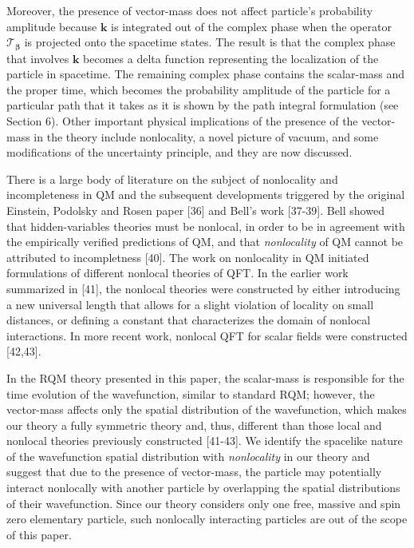 \documentclass[12pt]{iopart}
\begin{document}
Moreover, the presence of vector-mass does not affect particle's probability amplitude
because $\boldsymbol{k}$ is integrated out of the complex phase when the operator 
$\mathcal{T}_{\boldsymbol{\beta}}$ is projected onto the spacetime states.  The 
result is that the complex phase that involves $\boldsymbol{k}$ becomes a delta 
function representing the localization of the particle in spacetime.  The remaining 
complex phase contains the scalar-mass and the proper time, which becomes the 
probability amplitude of the particle for a particular path that it takes as it is shown 
by the path integral formulation (see Section 6).   Other important physical implications 
of the presence of the vector-mass in the theory include nonlocality, a novel picture 
of vacuum, and some modifications of the uncertainty principle, and they are now 
discussed.

There is a large body of literature on the subject of nonlocality and incompleteness in
QM and the subsequent developments triggered by the original Einstein, Podolsky and 
Rosen paper [36] and Bell's work [37-39].  Bell showed that hidden-variables theories 
must be nonlocal, in order to be in agreement with the empirically verified predictions 
of QM, and that {\it nonlocality} of QM cannot be attributed to incompletness [40].
The work on nonlocality in QM initiated formulations of different nonlocal theories 
of QFT.  In the earlier work summarized in [41], the nonlocal theories were constructed 
by either introducing a new universal length that allows for a slight violation of locality 
on small distances, or defining a constant that characterizes the domain of nonlocal 
interactions.  In more recent work, nonlocal QFT for scalar fields were constructed 
[42,43].  

In the RQM theory presented in this paper, the scalar-mass is responsible for the 
time evolution of the wavefunction, similar to standard RQM; however, the 
vector-mass affects only the spatial distribution of the wavefunction, which 
makes our theory a fully symmetric theory and, thus, different than those
local and nonlocal theories previously constructed [41-43].  We identify the 
spacelike nature of the wavefunction spatial distribution with {\it nonlocality}
in our theory and suggest that due to the presence of vector-mass, the particle 
may potentially interact nonlocally with another particle by overlapping the
spatial distributions of their wavefunction.  Since our theory considers only one 
free, massive and spin zero elementary particle, such nonlocally interacting 
particles are out of the scope of this paper.
\end{document}

